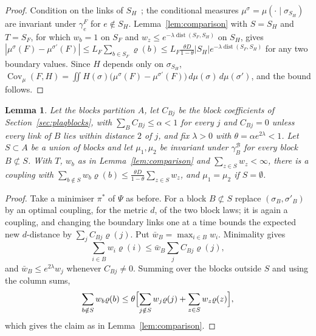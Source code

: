 \documentclass[11pt]{amsart}
\newtheorem{lemma}[theorem]{Lemma}
\theoremstyle{definition}
\theoremstyle{remark}
\numberwithin{equation}{section}
\newcommand{\Cov}{\operatorname{Cov}}
\newcommand{\dist}{\operatorname{dist}}
\begin{document}
\begin{proof}
Condition on the links of $S_H$~\cite[Ch.~3]{Kal21}; the conditional
measures $\mu^\sigma=\mu(\cdot\mid\sigma_{S_H})$ are invariant under
$\gamma^F_e$ for $e\notin S_H$. Lemma~\ref{lem:comparison} with $S=S_H$ and
$T=S_F$, for which $w_b=1$ on $S_F$ and $w_z\le e^{-\lambda\dist(S_F,S_H)}$ on
$S_H$, gives
$|\mu^\sigma(F)-\mu^{\sigma'}(F)|\le L_F\sum_{b\in S_F}\varrho(b)\le
L_F\frac{\theta D}{1-\theta}|S_H|e^{-\lambda\dist(S_F,S_H)}$ for any two
boundary values. Since $H$ depends only on $\sigma_{S_H}$,
$\Cov_\mu(F,H)=\iint H(\sigma)\bigl(\mu^\sigma(F)-\mu^{\sigma'}(F)\bigr)\,
d\mu(\sigma)\,d\mu(\sigma')$, and the bound follows.
\end{proof}

\begin{lemma}\label{lem:blockcomparison}
Let the blocks partition $A$, let $C_{Bj}$ be the block coefficients of
Section~\ref{sec:plaqblocks}, with $\sum_BC_{Bj}\le\alpha<1$ for every $j$ and
$C_{Bj}=0$ unless every link of $B$ lies within distance $2$ of $j$, and fix
$\lambda>0$ with $\theta=\alpha e^{2\lambda}<1$. Let $S\subset A$ be a union
of blocks and let $\mu_1,\mu_2$ be invariant under $\gamma^{\mathcal B}_B$ for
every block $B\not\subset S$. With $T$, $w_b$ as in
Lemma~\ref{lem:comparison} and $\sum_{z\in S}w_z<\infty$, there is a coupling
with $\sum_{b\notin S}w_b\varrho(b)\le\frac{\theta D}{1-\theta}\sum_{z\in S}w_z$,
and $\mu_1=\mu_2$ if $S=\emptyset$.
\end{lemma}

\begin{proof}
Take a minimiser $\pi^*$ of $\Psi$ as before. For a block $B\not\subset S$
replace $(\sigma_B,\sigma'_B)$ by an optimal coupling, for the metric $d$, of
the two block laws; it is again a coupling, and changing the boundary links
one at a time bounds the expected new $d$-distance by $\sum_jC_{Bj}\varrho(j)$.
Put $\bar w_B=\max_{i\in B}w_i$. Minimality gives
\[
\sum_{i\in B}w_i\varrho(i)\le\bar w_B\sum_jC_{Bj}\varrho(j),
\]
and $\bar w_B\le e^{2\lambda}w_j$ whenever $C_{Bj}\ne0$. Summing over the
blocks outside $S$ and using the column sums,
\[
\sum_{b\notin S}w_b\varrho(b)\le\theta\Bigl[\sum_{j\notin S}w_j\varrho(j)+
\sum_{z\in S}w_z\varrho(z)\Bigr],
\]
which gives the claim as in Lemma~\ref{lem:comparison}.
\end{proof}
\end{document}
